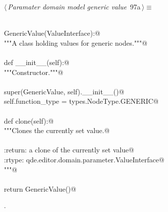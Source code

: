 \documentclass[
    a4paper,      %
    10pt,         %
    openright,    %
    notitlepage,  %
    parskip=half, %
]{scrreprt}       %
\theoremstyle{definition}                    %
\begin{document}
\begin{flushleft} \small
\begin{minipage}{\linewidth}\label{scrap155}\raggedright\small
{} $\langle\,${\itshape Paramater domain model generic value}\nobreak\ {\footnotesize {97a}}$\,\rangle\equiv$
\vspace{-1exm}
\begin{list}{}{} \item
\mbox{}\lstinline@@\\
\mbox{}\lstinline@class GenericValue(ValueInterface):@\\
\mbox{}\lstinline@    """A class holding values for generic nodes."""@\\
\mbox{}\lstinline@@\\
\mbox{}\lstinline@    def __init__(self):@\\
\mbox{}\lstinline@        """Constructor."""@\\
\mbox{}\lstinline@@\\
\mbox{}\lstinline@        super(GenericValue, self).__init__()@\\
\mbox{}\lstinline@        self.function_type = types.NodeType.GENERIC@\\
\mbox{}\lstinline@@\\
\mbox{}\lstinline@    def clone(self):@\\
\mbox{}\lstinline@        """Clones the currently set value.@\\
\mbox{}\lstinline@@\\
\mbox{}\lstinline@        :return: a clone of the currently set value@\\
\mbox{}\lstinline@        :rtype:  qde.editor.domain.parameter.ValueInterface@\\
\mbox{}\lstinline@        """@\\
\mbox{}\lstinline@@\\
\mbox{}\lstinline@        return GenericValue()@{\NWsep}
\end{list}
\vspace{-1.5ex}
\footnotesize
\begin{list}{}{\setlength{\itemsep}{-\parsep}\setlength{\itemindent}{-\leftmargin}}
\item {\NWtxtMacroNoRef}.

\item{}
\end{list}
\end{minipage}\vspace{4ex}
\end{flushleft}
\end{document}
